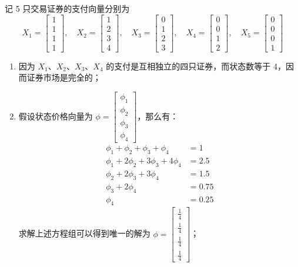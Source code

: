\begin{solution}
记 5 只交易证券的支付向量分别为
\[
    X_{1}=\begin{bmatrix}1 \\ 1 \\ 1 \\ 1\end{bmatrix},\quad X_{2}=\begin{bmatrix}1 \\ 2 \\ 3 \\ 4\end{bmatrix},\quad X_{3}=\begin{bmatrix}0 \\ 1 \\ 2 \\ 3\end{bmatrix},\quad X_{4}=\begin{bmatrix}0 \\ 0 \\ 1 \\ 2\end{bmatrix},\quad X_{5}=\begin{bmatrix}0 \\ 0 \\ 0 \\ 1\end{bmatrix}
\]
\begin{enumerate}[label=(\alph*)]
    \item 因为 $X_{1}$、$X_{2}$、$X_{3}$、$X_{4}$ 的支付是互相独立的四只证券，而状态数等于 4，因而证券市场是完全的；
    \item 假设状态价格向量为 $\phi=\begin{bmatrix}\phi_{1} \\ \phi_{2} \\ \phi_{3} \\ \phi_{4}\end{bmatrix}$，那么有：
    \[
        \begin{aligned}
            \phi_{1}+\phi_{2}+\phi_{3}+\phi_{4}&=1\\
            \phi_{1}+2\phi_{2}+3\phi_{3}+4\phi_{4}&=2.5\\
            \phi_{2}+2\phi_{3}+3\phi_{4}&=1.5\\
            \phi_{3}+2\phi_{4}&=0.75\\
            \phi_{4}&=0.25
        \end{aligned}
    \]
    求解上述方程组可以得到唯一的解为 $\phi=\begin{bmatrix}\tfrac14 \\ \tfrac14 \\ \tfrac14 \\ \tfrac14\end{bmatrix}$；

\end{enumerate}
\end{solution}
